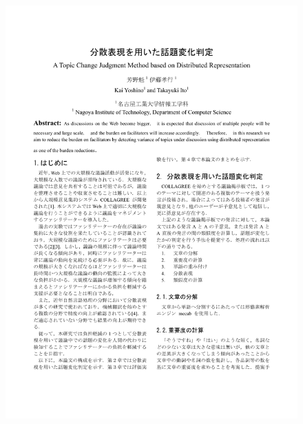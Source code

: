 \begin{figure}
	\centering
	\includegraphics[width=\linewidth,page=2]{../B.SIG-CCI2/yoshino-paper6.pdf}
\end{figure}

